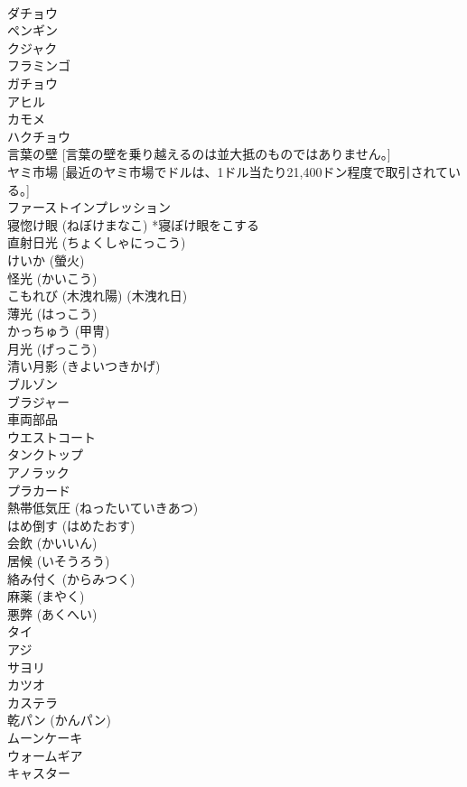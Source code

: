 \documentclass[8pt]{extreport}
\begin{document}
\begin{CJK}{UTF8}{min}
\\	ダチョウ 
\\	ペンギン 
\\	クジャク 
\\	フラミンゴ 
\\	ガチョウ 
\\	アヒル 
\\	カモメ 
\\	ハクチョウ 
\\	言葉の壁 [言葉の壁を乗り越えるのは並大抵のものではありません。]
\\	ヤミ市場 [最近のヤミ市場でドルは、1ドル当たり21,400ドン程度で取引されている。]
\\	ファーストインプレッション 
\\	寝惚け眼 (ねぼけまなこ) *寝ぼけ眼をこする
\\	直射日光 (ちょくしゃにっこう)
\\	けいか (螢火)
\\	怪光 (かいこう)
\\	こもれび (木洩れ陽) (木洩れ日)
\\	薄光 (はっこう)
\\	かっちゅう (甲冑)
\\	月光 (げっこう)
\\	清い月影 (きよいつきかげ)
\\	ブルゾン 
\\	ブラジャー 
\\	車両部品
\\	ウエストコート 
\\	タンクトップ 
\\	アノラック 
\\	プラカード 
\\	熱帯低気圧 (ねったいていきあつ) 
\\	はめ倒す (はめたおす)
\\	会飲 (かいいん)
\\	居候 (いそうろう)
\\	絡み付く (からみつく)
\\	麻薬 (まやく)
\\	悪弊 (あくへい)
\\	タイ
\\	アジ
\\	サヨリ
\\	カツオ 
\\	カステラ 
\\	乾パン (かんパン)
\\	ムーンケーキ
\\	ウォームギア 
\\	キャスター 

\end{CJK}
\end{document}
